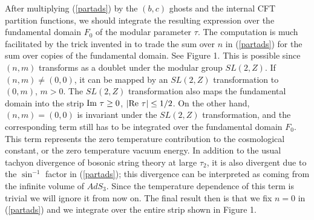 After multiplying (\ref{partads}) by the 
 $(b,c)$ ghosts  and the internal CFT partition functions, we should
integrate the resulting expression over the fundamental domain $F_0$ of the
modular parameter $\tau$.  The computation is much facilitated by
the trick invented in \cite{Polchinski}
to trade the sum over $n$ in (\ref{partads}) for the sum
over copies of the fundamental domain. See Figure 1. 
This is possible since $(n,m)$ transforms as a doublet
under the  modular group $SL(2,Z)$. 
If $(n,m)\neq (0,0)$, it can be mapped by an $SL(2,Z)$ 
transformation to $(0,m)$, $m>0$. The $SL(2,Z)$ transformation
also maps the fundamental domain into the strip ${\rm Im}\ \tau \geq 0$, 
$|{\rm Re}\ \tau| \leq 1/2 $.
On the other hand, $(n,m) = (0,0)$ is invariant under
the $SL(2,Z)$ transformation, and the corresponding term still has to be 
integrated over the fundamental domain $F_0$. This 
term represents the zero temperature contribution to the cosmological
constant, or the zero temperature vacuum energy. 
In addition to the usual tachyon 
divergence of bosonic string theory at large
$\tau_2$, it is also divergent due to the $\sin ^{-1}$ factor
in (\ref{partads}); this divergence can be interpreted as  coming from 
the infinite volume of $AdS_3$.  Since the temperature dependence 
of this term is  
trivial we will ignore it from now on.  
The final result then is that we fix $n=0$ in (\ref{partads}) 
and we integrate over the entire strip shown in Figure 1. 
%
